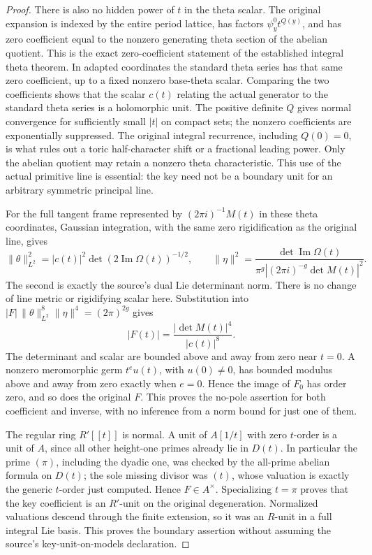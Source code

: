 \begin{proof}
There is also no hidden power of $t$ in the theta scalar.  The
original expansion is indexed by the entire period lattice, has
factors $\psi_y^0t^{Q(y)}$, and has zero coefficient equal to
the nonzero generating theta section of the abelian quotient.
This is the exact zero-coefficient statement of
the established integral theta theorem\cite{current-construction-record}.  In adapted coordinates the standard
theta series has that same zero coefficient, up to a fixed nonzero
base-theta scalar.  Comparing the two coefficients shows that the
scalar $c(t)$ relating the actual generator to the standard theta
series is a holomorphic unit.  The positive definite $Q$ gives
normal convergence for sufficiently small $|t|$ on compact sets;
the nonzero coefficients are exponentially suppressed.  The
original integral recurrence, including $Q(0)=0$, is what rules
out a toric half-character shift or a fractional leading power.
Only the abelian quotient may retain a nonzero theta
characteristic.  This use of the actual primitive line is
essential: the key need not be a boundary unit for an arbitrary
symmetric principal line.

For the full tangent frame represented by
$(2\pi i)^{-1}M(t)$ in these theta coordinates, Gaussian
integration, with the same zero rigidification as the original
line, gives
\[
 \|\theta\|_{L^2}^2
       =|c(t)|^2\det(2\operatorname{Im}\Omega(t))^{-1/2},
 \qquad
 \|\eta\|^2
       =\frac{\det\operatorname{Im}\Omega(t)}
                    {\pi^g|(2\pi i)^{-g}\det M(t)|^2}.
\]
The second is exactly the source's dual Lie determinant norm.
There is no change of line metric or rigidifying scalar here.
Substitution into
$|F|\,\|\theta\|_{L^2}^{8}\|\eta\|^4=(2\pi)^{2g}$ gives
\[
                     |F(t)|=
                         \frac{|\det M(t)|^4}{|c(t)|^8}.
\]
The determinant and scalar are bounded above and away from zero
near $t=0$.  A nonzero meromorphic germ $t^e u(t)$, with $u(0)\ne0$,
has bounded modulus above and away from zero exactly when $e=0$.
Hence the image of $F_0$ has order zero, and so does the original
$F$.  This proves the no-pole assertion for both coefficient and
inverse, with no inference from a norm bound for just one of them.

The regular ring $R'[[t]]$ is normal.  A unit of $A[1/t]$ with
zero $t$-order is a unit of $A$, since all other height-one primes
already lie in $D(t)$.  In particular the prime $(\pi)$, including
the dyadic one, was checked by the all-prime abelian formula on
$D(t)$; the sole missing divisor was $(t)$, whose valuation is
exactly the generic $t$-order just computed.  Hence
$F\in A^\times$.  Specializing
$t=\pi$ proves that the key coefficient is an $R'$-unit on the
original degeneration.  Normalized valuations descend through
the finite extension, so it was an $R$-unit in a full integral
Lie basis.  This proves the boundary assertion without assuming
the source's key-unit-on-models declaration.


\end{proof}
